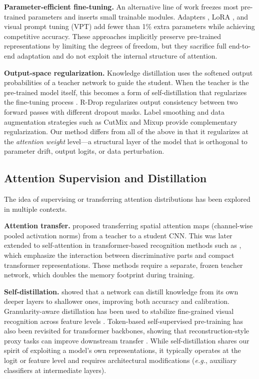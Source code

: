 \documentclass[review,12pt,authoryear]{elsarticle}
\begin{document}
\textbf{Parameter-efficient fine-tuning.}
An alternative line of work freezes most pre-trained parameters and inserts small trainable modules.
Adapters \citep{houlsby2019parameter}, LoRA \citep{hu2022lora}, and visual prompt tuning (VPT) \citep{jia2022visual} add fewer than 1\% extra parameters while achieving competitive accuracy.
These approaches implicitly preserve pre-trained representations by limiting the degrees of freedom, but they sacrifice full end-to-end adaptation and do not exploit the internal structure of attention.

\textbf{Output-space regularization.}
Knowledge distillation \citep{hinton2015distilling} uses the softened output probabilities of a teacher network to guide the student.
When the teacher is the pre-trained model itself, this becomes a form of self-distillation that regularizes the fine-tuning process \citep{mobahi2020self}.
R-Drop \citep{liang2021r} regularizes output consistency between two forward passes with different dropout masks.
Label smoothing \citep{szegedy2016rethinking} and data augmentation strategies such as CutMix \citep{yun2019cutmix} and Mixup \citep{zhang2018mixup} provide complementary regularization.
Our method differs from all of the above in that it regularizes at the \emph{attention weight} level---a structural layer of the model that is orthogonal to parameter drift, output logits, or data perturbation.

\subsection{Attention Supervision and Distillation}
\label{sec:related:attn}

The idea of supervising or transferring attention distributions has been explored in multiple contexts.

\textbf{Attention transfer.}
\citet{zagoruyko2017paying} proposed transferring spatial attention maps (channel-wise pooled activation norms) from a teacher to a student CNN.
This was later extended to self-attention in transformer-based recognition methods such as \citet{yu2023mixvit}, which emphasize the interaction between discriminative parts and compact transformer representations.
These methods require a separate, frozen teacher network, which doubles the memory footprint during training.

\textbf{Self-distillation.}
\citet{zhang2019your} showed that a network can distill knowledge from its own deeper layers to shallower ones, improving both accuracy and calibration.
Granularity-aware distillation has been used to stabilize fine-grained visual recognition across feature levels \citep{ke2023granularity}.
Token-based self-supervised pre-training has also been revisited for transformer backbones, showing that reconstruction-style proxy tasks can improve downstream transfer \citep{tian2025beyond}.
While self-distillation shares our spirit of exploiting a model's own representations, it typically operates at the logit or feature level and requires architectural modifications (\emph{e.g.}, auxiliary classifiers at intermediate layers).
\end{document}
